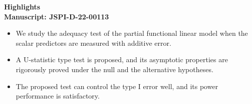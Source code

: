 \documentclass[12pt]{report}
\begin{document}
\begin{center}
{\bf\Large Highlights \\[6pt] \normalsize{Manuscript: %
JSPI-D-22-00113}}
\end{center}

\vspace{1cm}

\begin{itemize}

  \item  We study the adequacy test of the partial functional linear model
when the scalar predictors are measured with additive error.\\

  \item  A
U-statistic type test is proposed, and its asymptotic properties are rigorously proved
under the null and the alternative hypotheses.\\


  \item  The proposed test can
control the type I error well, and its power performance is satisfactory.

\end{itemize}
\end{document}
